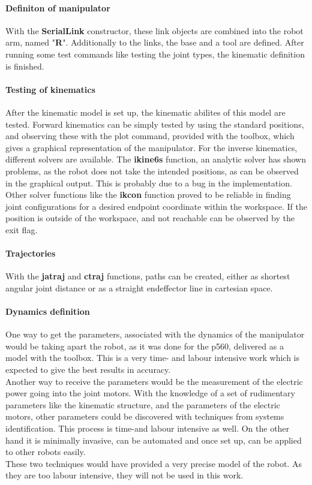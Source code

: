 \paragraph{Definiton of manipulator }
With the \textbf{SerialLink} constructor, these link objects are combined into the robot arm, named "\textbf{R}". 
Additionally to the links, the base and a tool are defined. After running some test commands like testing the joint types, the kinematic definition is finished.

\paragraph{Testing of kinematics}
After the kinematic model is set up, the kinematic abilites of this model are tested. 
Forward kinematics can be simply tested by using the standard positions, and observing these with the plot command, provided with the toolbox, which gives a graphical representation of the manipulator.
For the inverse kinematics, different solvers are available. The \textbf{ikine6s} function, an analytic solver has shown problems, as the robot does not take the intended positions, as can be observed in the graphical output. This is probably due to a bug in the implementation.
Other solver functions like the \textbf{ikcon} function proved to be reliable in finding joint configurations for a desired endpoint coordinate within the workspace. If the position is outside of the workspace, and not reachable can be observed by the exit flag.

\paragraph{Trajectories}
With the \textbf{jatraj} and \textbf{ctraj} functions, paths can be created, either as shortest angular joint distance or as a straight endeffector line in cartesian space.

\paragraph{Dynamics definition}
One way to get the parameters, associated with the dynamics of the manipulator would be taking apart the robot, as it was done for the p560, delivered as a model with the toolbox.
This is a very time- and labour intensive work which is expected to give the best results in accuracy.\\
Another way to receive the parameters would be the measurement of the electric power going into the joint motors. With the knowledge of a set of rudimentary parameters like the kinematic structure, and the parameters of the electric motors, other parameters could be discovered with techniques from systems identification. This process is time-and labour intensive as well. On the other hand it is minimally invasive, can be automated and once set up, can be applied to other robots easily.\\
These two techniques would have provided a very precise model of the robot. As they are too labour intensive, they will not be used in this work.\\

